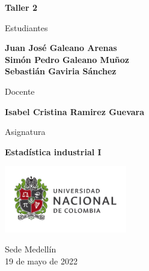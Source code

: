 \begin{titlepage}
   \Large{
   \begin{center}
       \vspace*{1cm}

       \textbf{Taller 2}

            
       \vspace{1.5cm}
       
       Estudiantes
       
       \vspace{0.5cm}
        
	\textbf{Juan José Galeano Arenas} \\   

       \textbf{Simón Pedro Galeano Muñoz} \\

	\textbf{Sebastián Gaviria Sánchez}

              \vspace{1cm}
       
       Docente
       
       \vspace{0.5cm}

       \textbf{Isabel Cristina Ramirez Guevara}
       
       \vspace{0.4cm}

       \vspace{1.4cm}
       
       Asignatura
       
       \vspace{0.5cm}

       \textbf{Estadística industrial I}

       \vfill

            
       \vspace{0.4cm}
     
       \includegraphics[width=0.4\textwidth]{logounal.png}
            
       Sede Medellín\\
       19 de mayo de 2022
       
   \end{center}
   }
\end{titlepage}